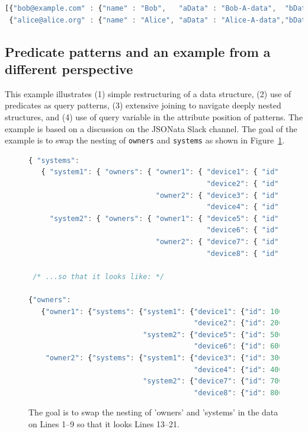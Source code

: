 \documentclass[9pt,letterpaper]{article}
\newcommand{\stt}[1]{\texttt{#1}} %
\begin{document}
\begin{lstlisting}[language=JavaScript,basicstyle=\ttfamily\scriptsize,numbers=none]
[{"bob@example.com" : {"name" : "Bob",   "aData" : "Bob-A-data",  "bData" : "Bob-B-data"  }},
 {"alice@alice.org" : {"name" : "Alice", "aData" : "Alice-A-data","bData" : "Alice-B-data"}}].
\end{lstlisting} \vspace{-2em}

\subsection{Predicate patterns and an example from a different perspective}

This example illustrates (1) simple restructuring of a data structure, (2) use of predicates as query patterns, (3) extensive joining
to navigate deeply nested structures, and (4) use of query variable in the attribute position of patterns.
The example is based on a discussion on the JSONata Slack channel.
The goal of the example is to swap the nesting of \stt{owners} and \stt{systems} as shown in Figure~\ref{data:restruct}.

\begin{figure}[H]
  \caption{The goal is to swap the nesting of 'owners' and 'systems' in the data on Lines 1--9
  so that it looks Lines 13--21.}
 \label{data:restruct}
\begin{lstlisting}[language=JavaScript,basicstyle=\ttfamily\scriptsize,numberstyle=\scriptsize]
{ "systems":
   { "system1": { "owners": { "owner1": { "device1": { "id": 100, "status": "Ok" },
                                          "device2": { "id": 200, "status": "Ok" }},
                              "owner2": { "device3": { "id": 300, "status": "Ok" },
                                          "device4": { "id": 400, "status": "Ok" }}}},
     "system2": { "owners": { "owner1": { "device5": { "id": 500, "status": "Ok" },
                                          "device6": { "id": 600, "status": "Ok" }},
                              "owner2": { "device7": { "id": 700, "status": "Ok" },
                                          "device8": { "id": 800, "status": "Ok" }}}}}}

 /* ...so that it looks like: */

{"owners":
   {"owner1": {"systems": {"system1": {"device1": {"id": 100, "status": "Ok"},
                                       "device2": {"id": 200, "status": "Ok"}},
                           "system2": {"device5": {"id": 500, "status": "Ok"},
                                       "device6": {"id": 600, "status": "Ok"}}},
    "owner2": {"systems": {"system1": {"device3": {"id": 300, "status": "Ok"},
                                       "device4": {"id": 400, "status": "Ok"}},
                           "system2": {"device7": {"id": 700, "status": "Ok"},
                                       "device8": {"id": 800, "status": "Ok"}}}}}))))
\end{lstlisting}
\end{figure}
\end{document}
